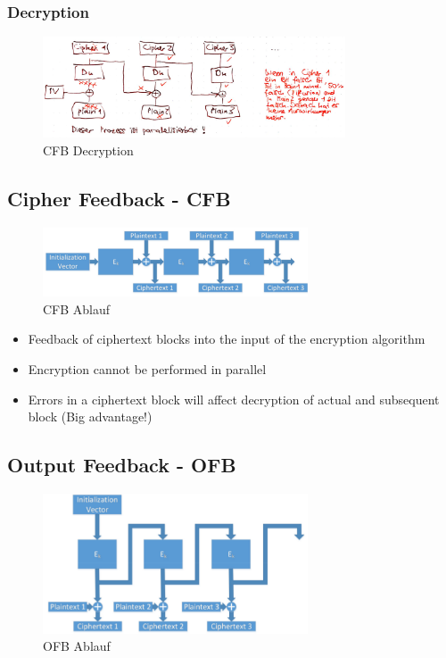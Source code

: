 \hypertarget{decryption}{%
\subsubsection{Decryption}\label{decryption}}

\begin{figure}[H]
\centering
\includegraphics[width=0.8\textwidth]{figures/cfb_decryption.png}
\caption{CFB Decryption}
\end{figure}


\hypertarget{cipher-feedback---cfb}{%
\subsection{Cipher Feedback - CFB}\label{cipher-feedback---cfb}}

\begin{figure}[H]
\centering
\includegraphics[width=0.7\textwidth]{figures/CFB.png}
\caption{CFB Ablauf}
\end{figure}

\begin{itemize}
    \item Feedback of ciphertext blocks into the input of the encryption algorithm
    \item Encryption cannot be performed in parallel
    \item Errors in a ciphertext block will affect decryption of actual and subsequent block (Big advantage!)
\end{itemize}


\hypertarget{output-feedback---ofb}{%
\subsection{Output Feedback - OFB}\label{output-feedback---ofb}}

\begin{figure}[H]
\centering
\includegraphics[width=0.7\textwidth]{figures/OFB.png}
\caption{OFB Ablauf}
\end{figure}

